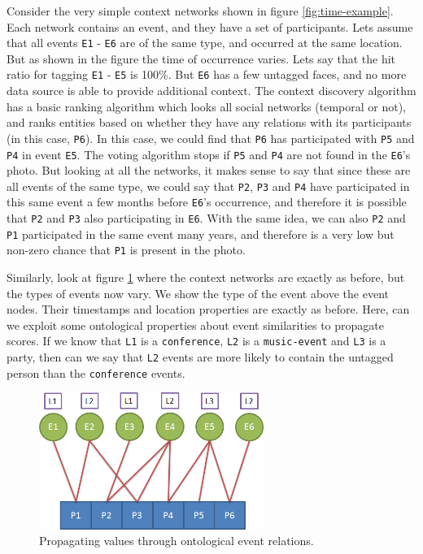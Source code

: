 Consider the very simple context networks shown in figure \ref{fig:time-example}. Each network contains an event, and they have a set of participants. Lets assume that all events \texttt{E1} - \texttt{E6} are of the same type, and occurred at the same location. But as shown in the figure the time of occurrence varies. Lets say that the hit ratio for tagging \texttt{E1} - \texttt{E5} is 100\%. But \texttt{E6} has a few untagged faces, and no more data source is able to provide additional context. The context discovery algorithm has a basic ranking algorithm which looks all social networks (temporal or not), and ranks entities based on whether they have any relations with its participants (in this case, \texttt{P6}). In this case, we could find that \texttt{P6} has participated with \texttt{P5} and \texttt{P4} in event \texttt{E5}. The voting algorithm stops if \texttt{P5} and \texttt{P4} are not found in the \texttt{E6}'s photo. But looking at all the networks, it makes sense to say that since these are all events of the same type, we could say that \texttt{P2}, \texttt{P3} and \texttt{P4} have participated in this same event a few months before \texttt{E6}'s occurrence, and therefore it is possible that \texttt{P2} and \texttt{P3} also participating in \texttt{E6}. With the same idea, we can also \texttt{P2} and \texttt{P1} participated in the same event many years, and therefore is a very low but non-zero chance that \texttt{P1} is present in the photo.

Similarly, look at figure \ref{fig:location-example} where the context networks are exactly as before, but the types of events now vary. We show the type of the event above the event nodes. Their timestamps and location properties are exactly as before. Here, can we exploit some ontological properties about event similarities to propagate scores. If we know that \texttt{L1} is a \texttt{conference}, \texttt{L2} is a \texttt{music-event} and \texttt{L3} is a party, then can we say that \texttt{L2} events are more likely to contain the untagged person than the \texttt{conference} events. 

\begin{figure}[h]
\centering
\includegraphics[width=0.65\textwidth]{media/chapter6/intuition-location-example.png}
\caption{Propagating values through ontological event relations.}
\label{fig:location-example}
\end{figure}

